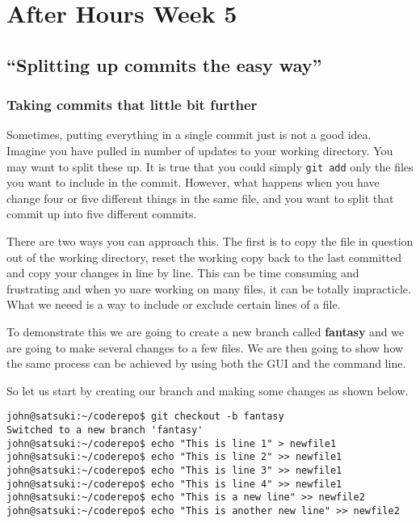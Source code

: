\chapter{After Hours Week 5}
\section{``Splitting up commits the easy way''}
\subsection{Taking commits that little bit further}

Sometimes, putting everything in a single commit just is not a good idea.  Imagine you have pulled in number of updates to your working directory.  You may want to split these up.  It is true that you could simply \texttt{git add} only the files you want to include in the commit.  However, what happens when you have change four or five different things in the same file, and you want to split that commit up into five different commits.

There are two ways you can approach this.  The first is to copy the file in question out of the working directory, reset the working copy back to the last committed and copy your changes in line by line.  This can be time consuming and frustrating and when yo uare working on many files, it can be totally impracticle.  What we neeed is a way to include or exclude certain lines of a file.

To demonstrate this we are going to create a new branch called \textbf{fantasy} and we are going to make several changes to a few files.  We are then going to show how the same process can be achieved by using both the GUI and the command line.

So let us start by creating our branch and making some changes as shown below.

\begin{Verbatim}[frame=leftline,framerule=1mm,fontsize=\relsize{-3}] 
john@satsuki:~/coderepo$ git checkout -b fantasy
Switched to a new branch 'fantasy'
john@satsuki:~/coderepo$ echo "This is line 1" > newfile1 
john@satsuki:~/coderepo$ echo "This is line 2" >> newfile1
john@satsuki:~/coderepo$ echo "This is line 3" >> newfile1
john@satsuki:~/coderepo$ echo "This is line 4" >> newfile1
john@satsuki:~/coderepo$ echo "This is a new line" >> newfile2 
john@satsuki:~/coderepo$ echo "This is another new line" >> newfile2 
\end{Verbatim}

